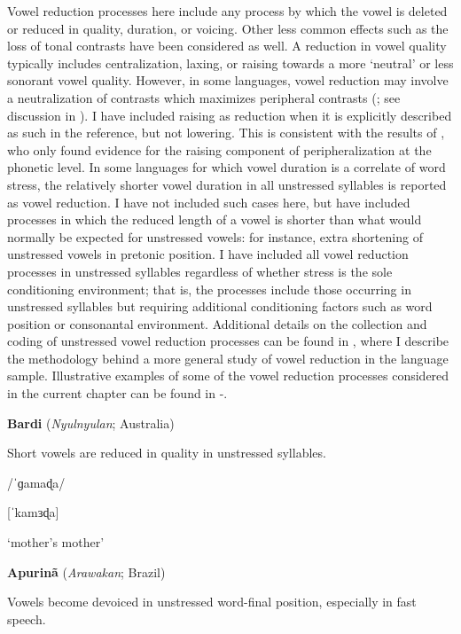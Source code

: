   Vowel reduction processes here include any process by which the vowel is deleted or reduced in quality, duration, or voicing. Other less common effects such as the loss of tonal contrasts have been considered as well. A reduction in vowel quality typically includes centralization, laxing, or raising towards a more ‘neutral’ or less sonorant vowel quality. However, in some languages, vowel reduction may involve a neutralization of contrasts which maximizes peripheral contrasts (\citealt{Crosswhite2001}; see discussion in ). I have included raising as reduction when it is explicitly described as such in the reference, but not lowering. This is consistent with the results of \citet{KapatsinskiEtAl2019}, who only found evidence for the raising component of peripheralization at the phonetic level. In some languages for which vowel duration is a correlate of word stress, the relatively shorter vowel duration in all unstressed syllables is reported as vowel reduction. I have not included such cases here, but have included processes in which the reduced length of a vowel is shorter than what would normally be expected for unstressed vowels: for instance, extra shortening of unstressed vowels in pretonic position. I have included all vowel reduction processes in unstressed syllables regardless of whether stress is the sole conditioning environment; that is, the processes include those occurring in unstressed syllables but requiring additional conditioning factors such as word position or consonantal environment. Additional details on the collection and coding of unstressed vowel reduction processes can be found in , where I describe the methodology behind a more general study of vowel reduction in the language sample. Illustrative examples of some of the vowel reduction processes considered in the current chapter can be found in -.

\ea\label{ex:(5.15)}
  \textbf{Bardi} (\textit{Nyulnyulan}; Australia)

Short vowels are reduced in quality in unstressed syllables.

/\textsf{ˈ}ɡamaɖa/

[\textsf{ˈ}kamɜɖa]

\glt ‘mother’s mother’

\citep[88-90]{Bowern2012}
\z

\ea\label{ex:(5.16)}
  \textbf{Apurinã} (\textit{Arawakan}; Brazil)

Vowels become devoiced in unstressed word-final position, especially in fast speech.

